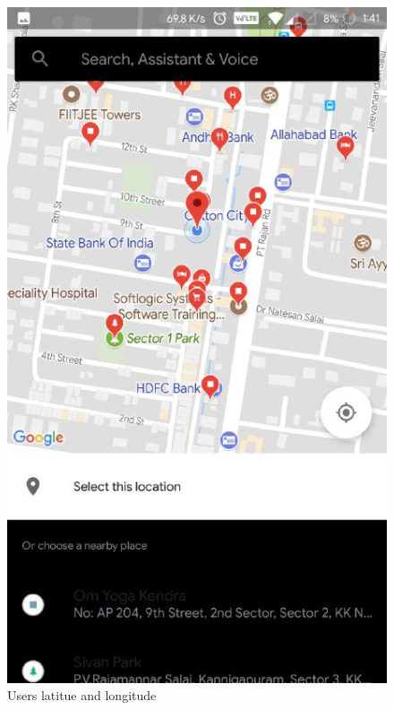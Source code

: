 \begin{figure}[h]
  \begin{center}
\includegraphics[scale=0.6]{3/five.jpeg}
\caption{Users latitue and longitude}
\label{fig:two}
\end{center}
\end{figure}


